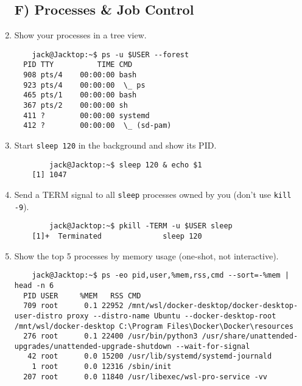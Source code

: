 \begin{enumerate}
\subsection*{F) Processes \& Job Control}

  \item Show your processes in a tree view.
    \begin{verbatim}
    jack@Jacktop:~$ ps -u $USER --forest
  PID TTY          TIME CMD
  908 pts/4    00:00:00 bash
  923 pts/4    00:00:00  \_ ps
  465 pts/1    00:00:00 bash
  367 pts/2    00:00:00 sh
  411 ?        00:00:00 systemd
  412 ?        00:00:00  \_ (sd-pam)
    \end{verbatim}
  \item Start \texttt{sleep 120} in the background and show its PID.
    \begin{verbatim}
        jack@Jacktop:~$ sleep 120 & echo $1
    [1] 1047
    \end{verbatim}
  \item Send a TERM signal to all \texttt{sleep} processes owned by you (don’t use \texttt{kill -9}).
    \begin{verbatim}
        jack@Jacktop:~$ pkill -TERM -u $USER sleep
    [1]+  Terminated              sleep 120
    \end{verbatim}
  \item Show the top 5 processes by memory usage (one-shot, not interactive).

    \begin{verbatim}
    jack@Jacktop:~$ ps -eo pid,user,%mem,rss,cmd --sort=-%mem | head -n 6
  PID USER     %MEM   RSS CMD
  709 root      0.1 22952 /mnt/wsl/docker-desktop/docker-desktop-user-distro proxy --distro-name Ubuntu --docker-desktop-root /mnt/wsl/docker-desktop C:\Program Files\Docker\Docker\resources
  276 root      0.1 22400 /usr/bin/python3 /usr/share/unattended-upgrades/unattended-upgrade-shutdown --wait-for-signal
   42 root      0.0 15200 /usr/lib/systemd/systemd-journald
    1 root      0.0 12316 /sbin/init
  207 root      0.0 11840 /usr/libexec/wsl-pro-service -vv
    \end{verbatim}

\end{enumerate}


